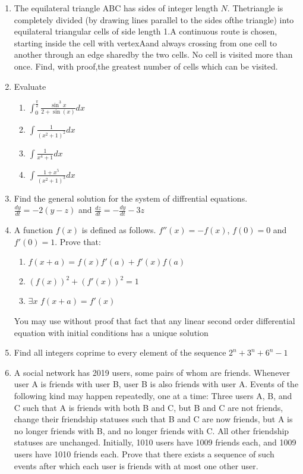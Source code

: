 \documentclass[a4paper]{article}
\begin{document}
\begin{enumerate}
	\item
	The equilateral triangle ABC has sides of integer length $N$.  Thetriangle is completely divided (by drawing lines parallel to the sides ofthe triangle) into equilateral triangular cells of side length 1.A continuous route is chosen, starting inside the cell with vertexAand always crossing from one cell to another through an edge sharedby the two cells. No cell is visited more than once. Find, with proof,the greatest number of cells which can be visited.

	\item
	Evaluate
	\begin{enumerate}
	    \item 
    	$\int_{0}^{\frac{\pi}{2}} \frac{\sin^3{x}}{2 + \sin(x)} dx$

        \item
    	$\int{\frac{1}{(x^2+1)^{2}}}dx$
    	
    	\item
    	$\int{\frac{1}{x^{4}+1}}dx$
    	
    	\item
    	$\int{\frac{1+x^{5}}{(x^{2}+1)^{3}}}dx$
	\end{enumerate}

	\item
	Find the general solution for the system of diffrential equations.
	$\frac{dy}{dt} = -2(y-z)$ and $\frac{dz}{dt} = -\frac{dy}{dt} - 3z$
	
	\item
	A function $f(x)$ is defined as follows. $f''(x) = -f(x)$, $f(0) = 0$ and $f'(0) = 1$. Prove that:
	\begin{enumerate}
	    \item $f(x + a) = f(x)f'(a) + f'(x)f(a)$
	    \item $(f(x))^2 + (f'(x))^2 = 1$
	    \item $\exists x$ $f(x+a) = f'(x)$
	\end{enumerate}
	You may use without proof that fact that any linear second order differential equation with initial conditions has a unique solution
	
	\item
	Find all integers coprime to every element of the sequence $2^{n} + 3^{n} + 6^{n}-1$
	
	\item
	A social network has 2019 users, some pairs of whom are friends. Whenever user A
    is friends with user B, user B is also friends with user A. Events of the following kind may happen
    repeatedly, one at a time:
    Three users A, B, and C such that A is friends with both B and C, but B and C are
    not friends, change their friendship statuses such that B and C are now friends, but A is
    no longer friends with B, and no longer friends with C. All other friendship statuses are
    unchanged.
    Initially, 1010 users have 1009 friends each, and 1009 users have 1010 friends each. Prove that there
    exists a sequence of such events after which each user is friends with at most one other user.
    

\end{enumerate}
\end{document}
